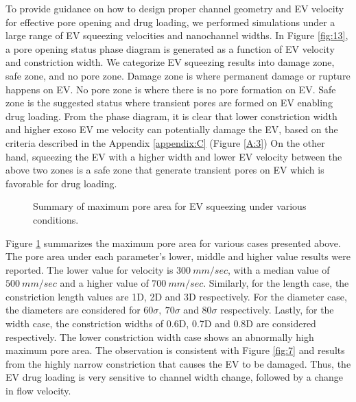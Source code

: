To provide guidance on how to design proper channel geometry and EV velocity for effective pore opening and drug loading, we performed simulations under a large range of EV squeezing velocities and nanochannel widths. In Figure \ref{fig:13}, a pore opening status phase diagram is generated as a function of EV velocity and constriction width. We categorize EV squeezing results into damage zone, safe zone, and no pore zone. Damage zone is where permanent damage or rupture happens on EV. No pore zone is where there is no pore formation on EV. Safe zone is the suggested status where transient pores are formed on EV enabling drug loading. From the phase diagram, it is clear that lower constriction width and higher exoso EV me velocity can potentially damage the EV, based on the criteria described in the Appendix \ref{appendix:C} (Figure \ref{A:3}) On the other hand, squeezing the EV with a higher width and lower EV velocity between the above two zones is a safe zone that generate transient pores on EV which is favorable for drug loading. 

\begin{figure}[htbp]
  \centering
  
  \vspace{0.5cm}
  \caption{Summary of maximum pore area for EV squeezing under various conditions.}
  \label{fig:14}
\end{figure}

Figure \ref{fig:14} summarizes the maximum pore area for various cases presented above. The pore area under each parameter's lower, middle and higher value results were reported. The lower value for velocity is $300\ mm/sec$, with a median value of $500\ mm/sec$  and a higher value of $700\ mm/sec$. Similarly, for the length case, the constriction length values are 1D, 2D and 3D respectively. For the diameter case, the diameters are considered for $60\sigma,\ 70\sigma$ and $80\sigma$  respectively. Lastly, for the width case, the constriction widths of 0.6D, 0.7D and 0.8D are considered respectively. The lower constriction width case shows an abnormally high maximum pore area. The observation is consistent with Figure \ref{fig:7} and results from the highly narrow constriction that causes the EV to be damaged. Thus, the EV drug loading is very sensitive to channel width change, followed by a change in flow velocity.




